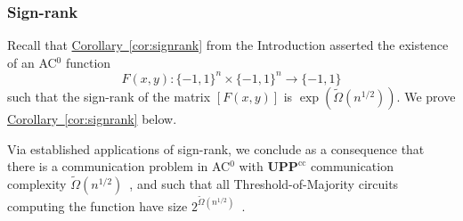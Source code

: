 \documentclass[11pt]{article}
\numberwithin{equation}{section}
\theoremstyle{definition}
\theoremstyle{plain}
\newcommand{\expref}[2]{\hyperref[#2]{#1~\ref{#2}}}
\newcommand{\bits}{\{-1,1\}}
\newcommand{\UPP}{\mathbf{UPP}}
\begin{document}
\subsubsection{Sign-rank}
Recall that \expref{Corollary}{cor:signrank} from the 
%
Introduction %
asserted the existence of an AC$^0$ function
%
\[ F(x, y) \colon \bits^n \times \bits^n \to \bits \]
such that the sign-rank of the matrix $[F(x, y)]$ is
 $\exp(\tilde{\Omega}(n^{1/2}))$.
We prove \expref{Corollary}{cor:signrank} below.

Via established applications of sign-rank, we conclude as a consequence that there is a communication problem in AC$^0$ 
with $\UPP^{\text{cc}}$ communication complexity $\tilde{\Omega}(n^{1/2})$~\cite{paturisimon}, and such that all
Threshold-of-Majority circuits computing the function have size $2^{\tilde{\Omega}(n^{1/2})}$~\cite{forstertm}. 
\end{document}
